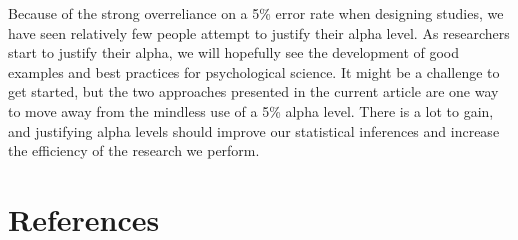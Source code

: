 \documentclass[
  english,
  ,jou,floatsintext]{apa6}
\begin{document}
Because of the strong overreliance on a 5\% error rate when designing studies, we have seen relatively few people attempt to justify their alpha level. As researchers start to justify their alpha, we will hopefully see the development of good examples and best practices for psychological science. It might be a challenge to get started, but the two approaches presented in the current article are one way to move away from the mindless use of a 5\% alpha level. There is a lot to gain, and justifying alpha levels should improve our statistical inferences and increase the efficiency of the research we perform.

\hypertarget{references}{%
\section{References}\label{references}}

\setlength{\parindent}{-0.5in}
\setlength{\leftskip}{0.5in}
\end{document}
